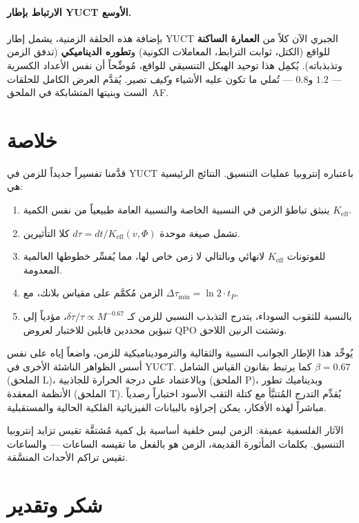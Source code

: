\documentclass[11pt,a4paper]{article}
\newcommand{\Ke}{K_{\mathrm{eff}}}
\begin{document}
	\paragraph{الارتباط بإطار YUCT الأوسع.}
	بإضافة هذه الحلقة الزمنية، يشمل إطار YUCT الجبري الآن كلاً من \textbf{العمارة الساكنة} للواقع (الكتل، ثوابت الترابط، المعاملات الكونية) و\textbf{تطوره الديناميكي} (تدفق الزمن وتذبذباته). يُكمِل هذا توحيد الهيكل التنسيقي للواقع، مُوضِّحاً أن نفس الأعداد الكسرية — \(1.2\) و\(0.8\) — تُملي ما تكون عليه الأشياء \emph{وكيف} تصير. يُقدَّم العرض الكامل للحلقات الست وبنيتها المتشابكة في الملحق~AF.
	
	\section{خلاصة}
	
	قدَّمنا تفسيراً جديداً للزمن في YUCT باعتباره إنتروبيا عمليات التنسيق. النتائج الرئيسية هي:
	\begin{enumerate}
		\item ينبثق تباطؤ الزمن في النسبية الخاصة والنسبية العامة طبيعياً من نفس الكمية \(\Ke\).
		\item تشمل صيغة موحدة \(d\tau = dt/\Ke(v,\Phi)\) كلا التأثيرين.
		\item للفوتونات \(\Ke\) لانهائي وبالتالي لا زمن خاص لها، مما يُفسِّر خطوطها العالمية المعدومة.
		\item الزمن مُكمَّم على مقياس بلانك، مع \(\Delta \tau_{\min} = \ln 2 \cdot t_P\).
		\item بالنسبة للثقوب السوداء، يتدرج التذبذب النسبي للزمن كـ \(\delta\tau/\tau \propto M^{-0.67}\)، مؤدياً إلى تنبؤين محددين قابلين للاختبار لعروض QPO وتشتت الرنين اللاحق.
	\end{enumerate}
	
	يُوحِّد هذا الإطار الجوانب النسبية والثقالية والترموديناميكية للزمن، واضعاً إياه على نفس أسس الظواهر الناشئة الأخرى في YUCT. كما يرتبط بقانون القياس الشامل \(\beta = 0.67\) (الملحق L)، وبالاعتماد على درجة الحرارة للجاذبية (الملحق P)، وبديناميك تطور الأنظمة المعقدة (الملحق T). يُقدِّم التدرج المُتنبَّأ مع كتلة الثقب الأسود اختباراً رصدياً مباشراً لهذه الأفكار، يمكن إجراؤه بالبيانات الفيزيائية الفلكية الحالية والمستقبلية.
	
	الآثار الفلسفية عميقة: الزمن ليس خلفية أساسية بل كمية مُشتقَّة تقيس تزايد إنتروبيا التنسيق. بكلمات المأثورة القديمة، الزمن هو بالفعل ما تقيسه الساعات — والساعات تقيس تراكم الأحداث المنسَّقة.
	
	\section*{شكر وتقدير}
	
\end{document}

